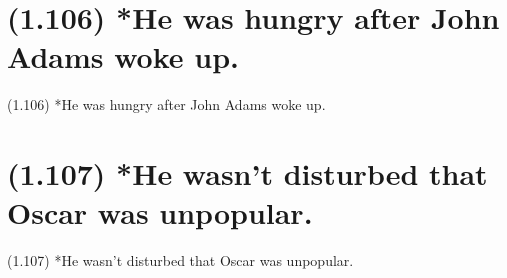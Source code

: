 \documentclass{article}
\begin{document}
\clearpage

%
%

\section*{(1.106) *He was hungry after John Adams woke up.}

\bigbreak
\begin{enumerate*}
\item[(1.106)] *He was hungry after John Adams woke up.
\end{enumerate*}
\bigbreak

\bigbreak
\begin{minipage}{\textwidth}
\end{minipage}
\bigbreak

\clearpage

%
%

\section*{(1.107) *He wasn't disturbed that Oscar was unpopular.}

\bigbreak
\begin{enumerate*}
\item[(1.107)] *He wasn't disturbed that Oscar was unpopular.
\end{enumerate*}
\bigbreak

\bigbreak
\begin{minipage}{\textwidth}
\end{minipage}
\bigbreak
\end{document}
